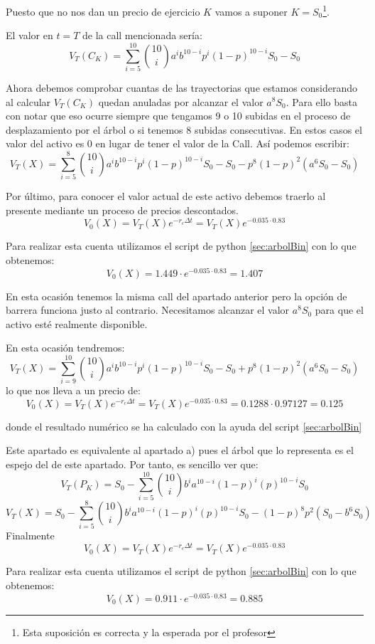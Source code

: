 \begin{problem}[2]
Puesto que no nos dan un precio de ejercicio $K$ vamos a suponer $K=S_0$\footnote{Esta suposición es correcta y la esperada por el profesor}.

El valor en $t=T$ de la call mencionada sería:
\[V_T(C_K) = \sum_{i=5}^{10}{10 \choose i}a^{i}b^{10-i}p^i(1-p)^{10-i}S_0-S_0\]

Ahora debemos comprobar cuantas de las trayectorias que estamos considerando al calcular $V_T(C_K)$ quedan anuladas por alcanzar el valor $a^8S_0$. Para ello basta con notar que eso ocurre siempre que tengamos 9 o 10 subidas en el proceso de desplazamiento por el árbol o si tenemos 8 subidas consecutivas. En estos casos el valor del activo es 0 en lugar de tener el valor de la Call. Así podemos escribir:
\[V_T(X)=\sum_{i=5}^{8}{10 \choose i}a^{i}b^{10-i}p^i(1-p)^{10-i}S_0-S_0-p^8(1-p)^2(a^6S_0-S_0)\]

Por último, para conocer el valor actual de este activo debemos traerlo al presente mediante un proceso de precios descontados.
\[V_0(X)=V_T(X)e^{-r_cΔt}=V_T(X)e^{-0.035\cdot 0.83}\]

Para realizar esta cuenta utilizamos el script de python \ref{sec:arbolBin} con lo que obtenemos:
\[V_0(X) = 1.449\cdot e^{-0.035\cdot 0.83} = 1.407\]

\spart

En esta ocasión tenemos la misma call del apartado anterior pero la opción de barrera funciona justo al contrario. Necesitamos alcanzar el valor $a^8S_0$ para que el activo esté realmente disponible.

En esta ocasión tendremos:
\[V_T(X)=\sum_{i=9}^{10}{10 \choose i}a^{i}b^{10-i}p^i(1-p)^{10-i}S_0-S_0+p^8(1-p)^2(a^6S_0-S_0)\]
lo que nos lleva a un precio de:
\[V_0(X)=V_T(X)e^{-r_cΔt}=V_T(X)e^{-0.035\cdot 0.83} = 0.1288 \cdot 0.97127 = 0.125\]

donde el resultado numérico se ha calculado con la ayuda del script \ref{sec:arbolBin}
\spart

Este apartado es equivalente al apartado a) pues el árbol que lo representa es el espejo del de este apartado. Por tanto, es sencillo ver que:
\[V_T(P_K) = S_0 -\sum_{i=5}^{10}{10 \choose i}b^{i}a^{10-i}(1-p)^i(p)^{10-i}S_0\]
\[V_T(X) = S_0 -\sum_{i=5}^{8}{10 \choose i}b^{i}a^{10-i}(1-p)^i(p)^{10-i}S_0-(1-p)^8p^2(S_0-b^6S_0)\]
Finalmente
\[V_0(X)=V_T(X)e^{-r_cΔt}=V_T(X)e^{-0.035\cdot 0.83}\]

Para realizar esta cuenta utilizamos el script de python \ref{sec:arbolBin} con lo que obtenemos:
\[V_0(X) = 0.911\cdot e^{-0.035\cdot 0.83} = 0.885\]


\end{problem}
